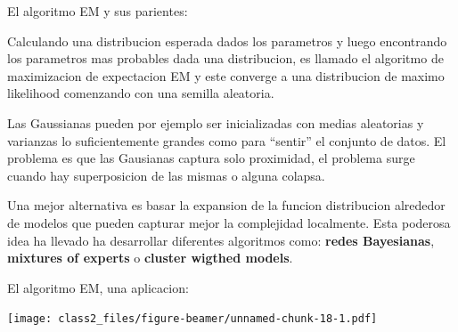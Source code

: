 \documentclass[ignorenonframetext,]{beamer}
\begin{document}
\begin{frame}

\begin{block}{El algoritmo EM y sus parientes:}

Calculando una distribucion esperada dados los parametros y luego
encontrando los parametros mas probables dada una distribucion, es
llamado el algoritmo de maximizacion de expectacion EM y este converge a
una distribucion de maximo likelihood comenzando con una semilla
aleatoria.

Las Gaussianas pueden por ejemplo ser inicializadas con medias
aleatorias y varianzas lo suficientemente grandes como para ``sentir''
el conjunto de datos. El problema es que las Gausianas captura solo
proximidad, el problema surge cuando hay superposicion de las mismas o
alguna colapsa.

Una mejor alternativa es basar la expansion de la funcion distribucion
alrededor de modelos que pueden capturar mejor la complejidad
localmente. Esta poderosa idea ha llevado ha desarrollar diferentes
algoritmos como: \textbf{redes Bayesianas}, \textbf{mixtures of experts}
o \textbf{cluster wigthed models}.

\end{block}

\end{frame}

\begin{frame}

\begin{block}{El algoritmo EM, una aplicacion:}

\texttt{[image: class2\_files/figure-beamer/unnamed-chunk-18-1.pdf]}

\end{block}

\end{frame}
\end{document}
